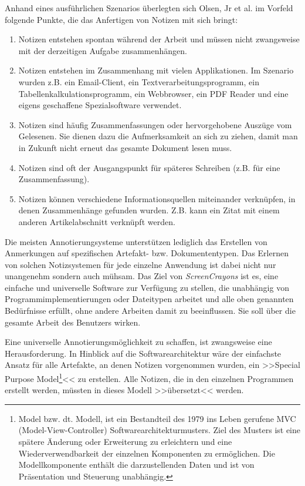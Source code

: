 \medskip Anhand eines ausführlichen Szenarios überlegten sich Olsen, Jr et al. im Vorfeld folgende Punkte, die das Anfertigen von Notizen mit sich bringt:

\begin{enumerate}
	\item Notizen entstehen spontan während der Arbeit und müssen nicht zwangsweise mit der derzeitigen Aufgabe zusammenhängen.
	\item Notizen entstehen im Zusammenhang mit vielen Applikationen. Im Szenario wurden z.B. ein Email-Client, ein Textverarbeitungsprogramm, ein Tabellenkalkulationsprogramm, ein Webbrowser, ein PDF Reader und eine eigens geschaffene Spezialsoftware verwendet.
	\item Notizen sind häufig Zusammenfassungen oder hervorgehobene Auszüge vom Gelesenen. Sie dienen dazu die Aufmerksamkeit an sich zu ziehen, damit man in Zukunft nicht erneut das gesamte Dokument lesen muss.
	\item Notizen sind oft der Ausgangspunkt für späteres Schreiben (z.B. für eine Zusammenfassung).
	\item Notizen können verschiedene Informationsquellen miteinander verknüpfen, in denen Zusammenhänge gefunden wurden. Z.B. kann ein Zitat mit einem anderen Artikelabschnitt verknüpft werden.
\end{enumerate}

Die meisten Annotierungsysteme unterstützen lediglich das Erstellen von Anmerkungen auf spezifischen Artefakt- bzw. Dokumententypen. Das Erlernen von solchen Notizsystemen für jede einzelne Anwendung ist dabei nicht nur unangenehm sondern auch mühsam. Das Ziel von \emph{ScreenCrayons} ist es, eine einfache und universelle Software zur Verfügung zu stellen, die unabhängig von Programmimplementierungen oder Dateitypen arbeitet und alle oben genannten Bedürfnisse erfüllt, ohne andere Arbeiten damit zu beeinflussen. Sie soll über die gesamte Arbeit des Benutzers wirken.

\medskip Eine universelle Annotierungsmöglichkeit zu schaffen, ist zwangsweise eine Herausforderung. In Hinblick auf die Softwarearchitektur wäre der einfachste Ansatz für alle Artefakte, an denen Notizen vorgenommen wurden, ein >>Special Purpose Model\footnote{Model bzw. dt. Modell, ist ein Bestandteil des 1979 ins Leben gerufene MVC (Model-View-Controller) Softwarearchitekturmusters. Ziel des Musters ist eine spätere Änderung oder Erweiterung zu erleichtern und eine Wiederverwendbarkeit der einzelnen Komponenten zu ermöglichen. Die Modellkomponente enthält die darzustellenden Daten und ist von Präsentation und Steuerung unabhängig.}<< zu erstellen. Alle Notizen, die in den einzelnen Programmen erstellt werden, müssten in dieses Modell >>übersetzt<< werden. 

